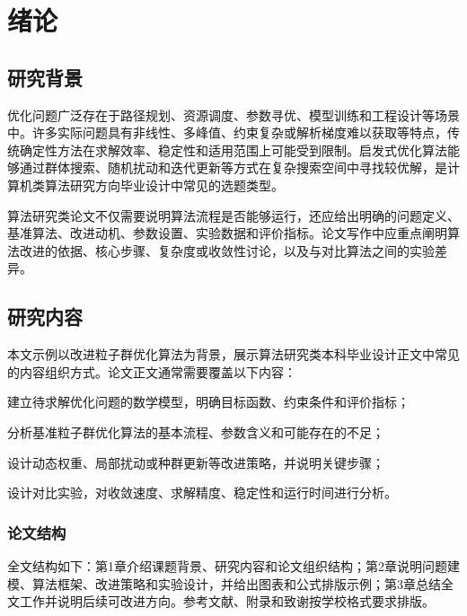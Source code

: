 \chapter{绪论}

\section{研究背景}

优化问题广泛存在于路径规划、资源调度、参数寻优、模型训练和工程设计等场景中。许多实际问题具有非线性、多峰值、约束复杂或解析梯度难以获取等特点，传统确定性方法在求解效率、稳定性和适用范围上可能受到限制。启发式优化算法能够通过群体搜索、随机扰动和迭代更新等方式在复杂搜索空间中寻找较优解，是计算机类算法研究方向毕业设计中常见的选题类型。

算法研究类论文不仅需要说明算法流程是否能够运行，还应给出明确的问题定义、基准算法、改进动机、参数设置、实验数据和评价指标。论文写作中应重点阐明算法改进的依据、核心步骤、复杂度或收敛性讨论，以及与对比算法之间的实验差异。

\section{研究内容}

本文示例以改进粒子群优化算法为背景，展示算法研究类本科毕业设计正文中常见的内容组织方式。论文正文通常需要覆盖以下内容：

\begin{custenum}
  \item 建立待求解优化问题的数学模型，明确目标函数、约束条件和评价指标；
  \item 分析基准粒子群优化算法的基本流程、参数含义和可能存在的不足；
  \item 设计动态权重、局部扰动或种群更新等改进策略，并说明关键步骤；
  \item 设计对比实验，对收敛速度、求解精度、稳定性和运行时间进行分析。
\end{custenum}

\subsection{论文结构}

全文结构如下：第1章介绍课题背景、研究内容和论文组织结构；第2章说明问题建模、算法框架、改进策略和实验设计，并给出图表和公式排版示例；第3章总结全文工作并说明后续可改进方向。参考文献、附录和致谢按学校格式要求排版。
